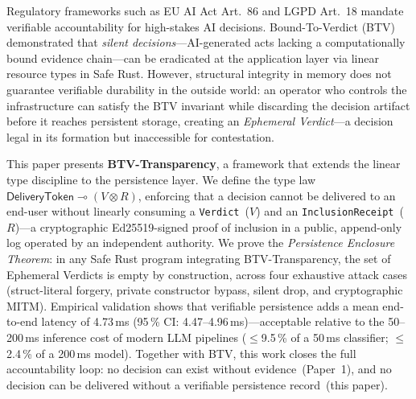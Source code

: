 Regulatory frameworks such as EU AI Act Art.~86 and LGPD Art.~18 mandate
verifiable accountability for high-stakes AI decisions. Bound-To-Verdict
(BTV)~\cite{btv2026} demonstrated that \emph{silent decisions}---AI-generated
acts lacking a computationally bound evidence chain---can be eradicated at the
application layer via linear resource types in Safe Rust. However, structural
integrity in memory does not guarantee verifiable durability in the outside
world: an operator who controls the infrastructure can satisfy the BTV invariant
while discarding the decision artifact before it reaches persistent storage,
creating an \emph{Ephemeral Verdict}---a decision legal in its formation but
inaccessible for contestation.

This paper presents \textbf{BTV-Transparency}, a framework that extends the
linear type discipline to the persistence layer. We define the type law
$\mathsf{DeliveryToken} \multimap (V \otimes R)$, enforcing that a decision
cannot be delivered to an end-user without linearly consuming a
\texttt{Verdict}~($V$) and an \texttt{InclusionReceipt}~($R$)---a
cryptographic Ed25519-signed proof of inclusion in a public, append-only log
operated by an independent authority. We prove the \emph{Persistence Enclosure
Theorem}: in any Safe Rust program integrating BTV-Transparency, the set of
Ephemeral Verdicts is empty by construction, across four exhaustive attack
cases (struct-literal forgery, private constructor bypass, silent drop, and
cryptographic MITM). Empirical validation shows that verifiable persistence
adds a mean end-to-end latency of 4.73\,ms (95\,\% CI: 4.47--4.96\,ms)---acceptable
relative to the 50--200\,ms inference cost of modern LLM pipelines
($\leq$9.5\,\% of a 50\,ms classifier; $\leq$2.4\,\% of a 200\,ms model). Together
with BTV, this work closes the full accountability loop: no decision can exist
without evidence~(Paper~1), and no decision can be delivered without a
verifiable persistence record~(this paper).
